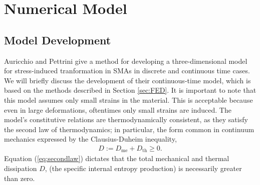 \chapter{Numerical Model}
\begin{multicols}{2}
\section{Model Development}
Auricchio and Pettrini \cite{auricchio2004three} give a method for developing a three-dimensional model for stress-induced tranformation in SMAs in discrete and continuous time cases. We will briefly discuss the development of their continuous-time model, which is based on the methods described in Section \ref{sec:FED}. It is important to note that this model assumes only small strains in the material. This is acceptable because even in large deformations, oftentimes only small strains are induced. The model's constitutive relations are thermodynamically consistent, as they satisfy the second law of thermodynamics; in particular, the form common in continuum mechanics expressed by the Clausius-Duheim inequality,
\begin{align}
    D:=D_\mathrm{me}+D_\mathrm{th}\geq0.\label{eq:secondlaw}
\end{align}
Equation (\ref{eq:secondlaw}) dictates that the total mechanical and thermal dissipation $D$, (the specific internal entropy production) is necessarily greater than zero.\cite{smith2005smart}


\end{multicols}
